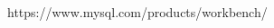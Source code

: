 \documentclass[runningheads]{llncs}
\begin{document}

\newpage
\newpage
\hfill

\newpage

\newpage

\newpage

%
%
%
% 
% 
%
\begin{thebibliography}{8}

 https://www.mysql.com/products/workbench/

\end{thebibliography}
%
\end{document}
